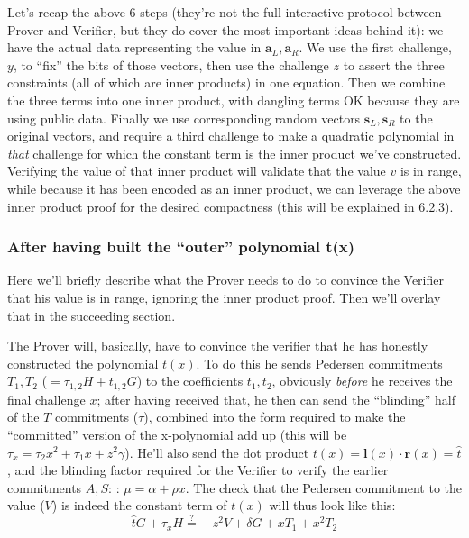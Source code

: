 \documentclass[10pt,a4paper]{article}
\begin{document}
Let's recap the above 6 steps (they're not the full interactive protocol
between Prover and Verifier, but they do cover the most important ideas
behind it): we have the actual data representing the value in $\mathbf{a}_L, \mathbf{a}_R$. We use
the first challenge, $y$, to ``fix'' the bits of those vectors, then use
the challenge $z$ to assert the three constraints (all of which are inner
products) in one equation. Then we combine the three terms into one
inner product, with dangling terms OK because they are using public
data. Finally we use corresponding random vectors $\mathbf{s}_L, \mathbf{s}_R$ to the original
vectors, and require a third challenge to make a quadratic polynomial in
\emph{that} challenge for which the constant term is the inner product
we've constructed. Verifying the value of that inner product will
validate that the value $v$ is in range, while because it has been encoded
as an inner product, we can leverage the above inner product proof for
the desired compactness (this will be explained in 6.2.3).

\hypertarget{after-having-built-the-outer-polynomial-tx}{%
\subsubsection[After having built the ``outer'' polynomial
t(x)]{\texorpdfstring{\protect\hypertarget{anchor-56}{}{}After having
built the ``outer'' polynomial
t(x)}{After having built the ``outer'' polynomial t(x)}}\label{after-having-built-the-outer-polynomial-tx}}

Here we'll briefly describe what the Prover needs to do to convince the
Verifier that his value is in range, ignoring the inner product proof.
Then we'll overlay that in the succeeding section.

The Prover will, basically, have to convince the verifier that he has
honestly constructed the polynomial $t(x)$. To do this he sends Pedersen
commitments $T_1, T_2$ ($=\tau_{1,2} H + t_{1,2} G$) to the coefficients $t_1, t_2$, obviously \emph{before} he receives
the final challenge $x$; after having received that, he then can send the
``blinding'' half of the $T$ commitments ($\tau$), combined into the form required
to make the ``committed'' version of the x-polynomial add up (this will
be $\tau_x = \tau_2x^2 + \tau_1x+z^2\gamma$). He'll also send the dot product $t(x) = \textbf{l}(x)\cdot \textbf{r}(x) = \hat{t}$, and the blinding factor required
for the Verifier to verify the earlier commitments $A, S$: : $\mu = \alpha + \rho x$. The check that
the Pedersen commitment to the value ($V$) is indeed the constant term of $t(x)$
will thus look like this:
\[\hat{t}G + \tau_x H \stackrel{?}{=} \quad z^2V + \delta G + xT_1 + x^2T_2\]
\end{document}
